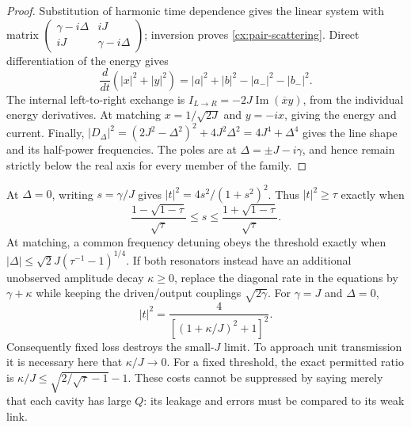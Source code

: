 \begin{proof}
Substitution of harmonic time dependence gives the linear system with
matrix $\left(\begin{smallmatrix}\gamma-i\Delta&iJ\\
iJ&\gamma-i\Delta\end{smallmatrix}\right)$; inversion proves
\eqref{cx:pair-scattering}. Direct differentiation of the energy gives
\begin{equation}
 \frac{d}{dt}(|x|^2+|y|^2)
 =|a|^2+|b|^2-|a_-|^2-|b_-|^2.
 \label{cx:pair-energy-balance}
\end{equation}
The internal left-to-right exchange is
$I_{L\to R}=-2J\operatorname{Im}(\overline x y)$, from the individual
energy derivatives. At matching $x=1/\sqrt{2J}$ and $y=-ix$, giving the
energy and current. Finally,
$|D_\Delta|^2=(2J^2-\Delta^2)^2+4J^2\Delta^2
=4J^4+\Delta^4$ gives the line shape and its half-power frequencies.
The poles are at $\Delta=\pm J-i\gamma$, and hence remain strictly
below the real axis for every member of the family.
\end{proof}

\begin{remark}
\label{cx:pair-sensitivity}
At $\Delta=0$, writing $s=\gamma/J$ gives
$|t|^2=4s^2/(1+s^2)^2$. Thus $|t|^2\geq\tau$ exactly when
\begin{equation}
 \frac{1-\sqrt{1-\tau}}{\sqrt\tau}\leq s\leq
 \frac{1+\sqrt{1-\tau}}{\sqrt\tau}.
 \label{cx:rate-tolerance}
\end{equation}
At matching, a common frequency detuning obeys the threshold exactly when
$|\Delta|\leq\sqrt2 J(\tau^{-1}-1)^{1/4}$.
If both resonators instead have an additional unobserved amplitude decay
$\kappa\geq0$, replace the diagonal rate in the equations by
$\gamma+\kappa$ while keeping the driven/output couplings
$\sqrt{2\gamma}$. For $\gamma=J$ and $\Delta=0$,
\begin{equation}
 |t|^2=\frac4{[(1+\kappa/J)^2+1]^2}.
 \label{cx:loss-tolerance}
\end{equation}
Consequently fixed loss destroys the small-$J$ limit. To approach unit
transmission it is necessary here that $\kappa/J\to0$.
For a fixed threshold, the exact permitted ratio is
$\kappa/J\leq\sqrt{2/\sqrt\tau-1}-1$.
These costs cannot be suppressed by saying merely that each cavity has
large $Q$: its leakage and errors must be compared to its weak link.
\end{remark}

